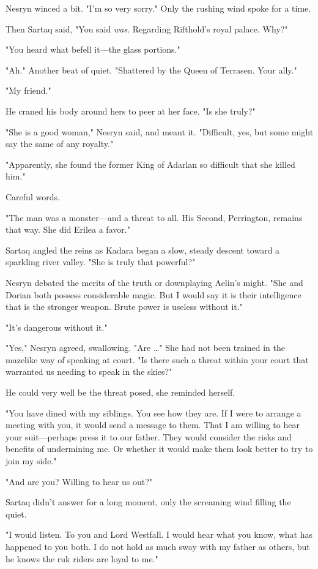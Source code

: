 Nesryn winced a bit. "I'm so very sorry." Only the rushing wind spoke for a time.

Then Sartaq said, "You said \emph{was}. Regarding Rifthold's royal palace. Why?"

"You heard what befell it---the glass portions."

"Ah." Another beat of quiet. "Shattered by the Queen of Terrasen. Your  ally."

"My friend."

He craned his body around hers to peer at her face. "Is she truly?"

"She is a good woman," Nesryn said, and meant it. "Difficult, yes, but  some might say the same of any royalty."

"Apparently, she found the former King of Adarlan so difficult that she killed him."

Careful words.

"The man was a monster---and a threat to all. His Second, Perrington, remains that way. She did Erilea a favor."

Sartaq angled the reins as Kadara began a slow, steady descent toward a sparkling river valley. "She is truly that powerful?"

Nesryn debated the merits of the truth or downplaying Aelin's might. "She and Dorian both possess considerable magic. But I would say it is their intelligence that is the stronger weapon. Brute power is useless without it."

"It's dangerous without it."

"Yes," Nesryn agreed, swallowing. "Are \ldots" She had not been trained in the mazelike way of speaking at court. "Is there such a threat within your court that warranted us needing to speak in the skies?"

He could very well be the threat posed, she reminded herself.

"You have dined with my siblings. You see how they are. If I were to arrange a meeting with you, it would send a message to them. That I am willing to hear your suit---perhaps press it to our father. They would consider the risks and benefits of undermining me. Or whether it would make them look better to try to join  my side."

"And are you? Willing to hear us out?"

Sartaq didn't answer for a long moment, only the screaming wind filling the quiet.

"I would listen. To you and Lord Westfall. I would hear what you know, what has happened to you both. I do not hold as much sway with my father as others, but he knows the ruk riders are loyal to me."

